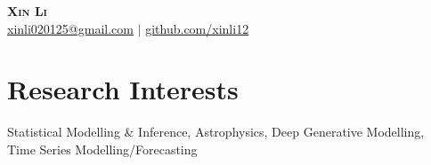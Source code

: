 \documentclass[a4paper,11pt]{article}
\newcommand{\resumeItem}[1]{
  \item\small{
    {#1 \vspace{-2pt}}
  }
}
\newcommand{\resumeItemListStart}{\begin{itemize}}
\newcommand{\resumeItemListEnd}{\end{itemize}\vspace{-5pt}}
\begin{document}

    \textbf{\Huge \scshape Xin Li} \\ \vspace{1pt}
    \href{mailto:xinli020125@gmail.com}{\underline{xinli020125@gmail.com}} $|$ 
    \href{https://github.com/xinli12}{\underline{github.com/xinli12}}

\section{Research Interests}
\begin{itemize}[leftmargin=0.15in, label={}, itemsep=0pt, parsep=0pt]
    \small{\item{Statistical Modelling \& Inference, Astrophysics, Deep Generative Modelling, Time Series Modelling/Forecasting}}
\end{itemize}

\end{document}
